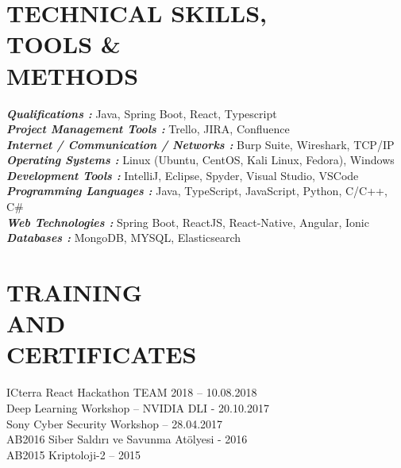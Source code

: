 \documentclass[margin]{res}
\begin{document}
\begin{resume}
\section{\mysidestyle \textbf{TECHNICAL SKILLS, \\ TOOLS \& \\ METHODS}} 
{\sl \textbf{Qualifications :}}  Java, Spring Boot, React, Typescript \\[0.03in]
{\sl \textbf{Project Management Tools :}}  Trello, JIRA, Confluence  \\ [0.03in]
{\sl \textbf{Internet / Communication / Networks :}} Burp Suite, Wireshark, TCP/IP \\ [0.03in]
{\sl \textbf{Operating Systems :}}  Linux (Ubuntu, CentOS, Kali Linux, Fedora), Windows \\[0.03in]
{\sl \textbf{Development Tools :}}  IntelliJ, Eclipse, Spyder, Visual Studio, VSCode  \\ [0.03in]
{\sl \textbf{Programming Languages :}} Java, TypeScript, JavaScript, Python, C/C++, C\# \\ [0.03in]
{\sl \textbf{Web Technologies :}} Spring Boot, ReactJS, React-Native, Angular, Ionic \\ [0.03in]
{\sl \textbf{Databases :}}  MongoDB, MYSQL, Elasticsearch \\[0.03in]


\section{\mysidestyle \textbf{TRAINING \\ AND \\ CERTIFICATES}} 
ICterra React Hackathon TEAM 2018 – 10.08.2018 \\
Deep Learning Workshop – NVIDIA DLI - 20.10.2017 \\
Sony Cyber Security Workshop – 28.04.2017 \\
AB2016 Siber Saldırı ve Savunma Atölyesi - 2016 \\
AB2015 Kriptoloji-2 – 2015 

\end{resume}
\end{document}
